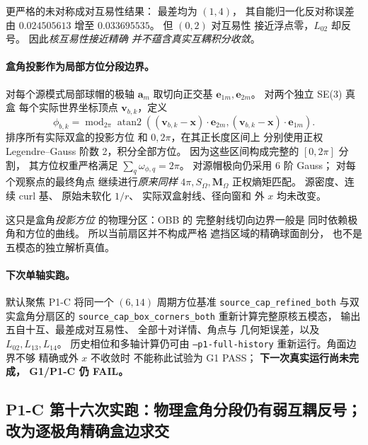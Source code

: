 更严格的未对称成对互易性结果：
最差均为 $(1,4)$，
其自能归一化反对称误差
由 $0.024505613$ 增至
$0.033695535$。
但 $(0,2)$ 对互易性
接近浮点零，$L_{02}$ 却反号。
因此\emph{核互易性接近精确
并不蕴含真实互耦积分收敛}。

\paragraph{盒角投影作为局部方位分段边界。}
对每个源模式局部球帽的极轴
$\bm a_m$ 取切向正交基
$\bm e_{1m},\bm e_{2m}$。
对两个独立 SE(3) 真盒
每个实际世界坐标顶点
$\bm v_{b,k}$，定义
\[
 \phi_{b,k}=
 \operatorname{mod}_{2\pi}
 \operatorname{atan2}\left(
 (\bm v_{b,k}-\bm x)\cdot\bm e_{2m},
 (\bm v_{b,k}-\bm x)\cdot\bm e_{1m}
 \right).
\]
排序所有实际双盒的投影方位
和 $0,2\pi$，在其正长度区间上
分别使用正权 Legendre--Gauss
阶数 2，积分全部方位。
因为这些区间构成完整的
$[0,2\pi]$ 分割，
其方位权重严格满足
$\sum_q\omega_{\phi,q}=2\pi$。
对源帽极向仍采用 6 阶 Gauss；
对每个观察点的最终角点
继续进行\emph{原来同样}
$4\pi,S_\Omega,\bm M_\Omega$
正权熵矩匹配。
源密度、连续 curl 基、
原始未软化 $1/r$、
实际双盒射线、径向窗和
外 $x$ 均未改变。

这只是盒角\emph{投影方位}
的物理分区：OBB 的
完整射线切向边界一般是
同时依赖极角和方位的曲线。
所以当前扇区并不构成严格
遮挡区域的精确球面剖分，
也不是五模态的独立解析真值。

\paragraph{下次单轴实跑。}
默认聚焦 P1-C 将同一个
$(6,14)$ 周期方位基准
\texttt{source\_cap\_refined\_both}
与双实盒角分扇区的
\texttt{source\_cap\_box\_corners\_both}
重新计算完整原核五模态，
输出五自十互、最差成对互易性、
全部十对详情、角点与
几何矩误差，以及
$L_{02},L_{13},L_{14}$。
历史相位和多轴计算仍可由
\texttt{--p1-full-history}
重新运行。角面边界不够
精确或外 $x$ 不收敛时
不能称此试验为 G1 PASS；
\textbf{下一次真实运行尚未完成，
G1/P1-C 仍 FAIL。}


\subsection{P1-C 第十六次实跑：物理盒角分段仍有弱互耦反号；改为逐极角精确盒边求交}
\label{sec:p1-c-obb-edge-cone-mu-dependent-azimuth}

